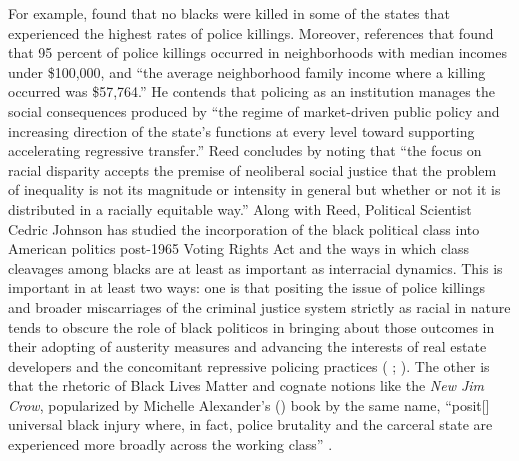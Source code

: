 \documentclass[12pt]{article}
\begin{document}
For example, \textcite{reedHowRacialDisparity2016} found that no blacks were killed in some of the states that experienced the highest rates of police killings. Moreover, \textcite{reedHowRacialDisparity2016} references that \parencite{jilani95PoliceKillings2015} found that 95 percent of police killings occurred in neighborhoods with median incomes under \$100,000, and “the average neighborhood family income where a killing occurred was \$57,764.” He contends that policing as an institution manages the social consequences produced by “the regime of market-driven public policy and increasing direction of the state’s functions at every level toward supporting accelerating regressive transfer.” Reed concludes by noting that “the focus on racial disparity accepts the premise of neoliberal social justice that the problem of inequality is not its magnitude or intensity in general but whether or not it is distributed in a racially equitable way.” Along with Reed, Political Scientist Cedric Johnson has studied the incorporation of the black political class into American politics post-1965 Voting Rights Act and the ways in which class cleavages among blacks are at least as important as interracial dynamics. This is important in at least two ways: one is that positing the issue of police killings and broader miscarriages of the criminal justice system strictly as racial in nature tends to obscure the role of black politicos in bringing about those outcomes in their adopting of austerity measures and advancing the interests of real estate developers and the concomitant repressive policing practices (\citeauthor{johnsonAfterwordBaltimorePolicing2016} \citeyear[305]{johnsonAfterwordBaltimorePolicing2016}; \citeyear[179]{johnsonTrumpismPolicingProblem2019}). The other is that the rhetoric of Black Lives Matter and cognate notions like the \textit{New Jim Crow}, popularized by Michelle Alexander’s (\citeyear{alexanderNewJimCrow2010}) book by the same name, “posit[] universal black injury where, in fact, police brutality and the carceral state are experienced more broadly across the working class” \parencite*[317]{johnsonAfterwordBaltimorePolicing2016}.

\end{document}
